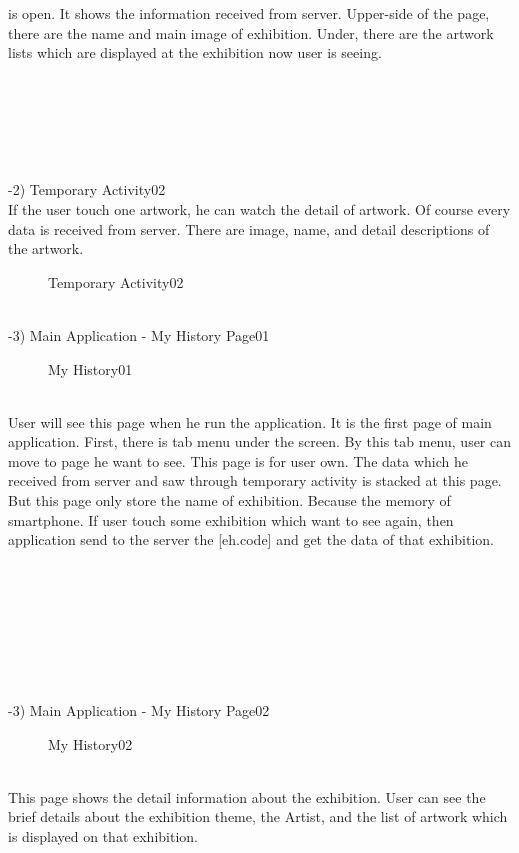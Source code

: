 \documentclass[conference]{IEEEtran}
\begin{document}
is open. It shows the information received from server. Upper-side of the page, there are the name and main image of exhibition. Under, there are the artwork lists which are displayed at the exhibition now user is seeing.\\\\\\\\\\\\\\

-2) Temporary Activity02 \\
\quad If the user touch one artwork, he can watch the detail of artwork. Of course every data is received from server. There are image, name, and detail descriptions of the artwork. 
\begin{figure}[htbp]
\begin{center}
    \caption{Temporary Activity02} 
\end{center}
\end{figure}
\\

-3) Main Application - My History Page01\\
\begin{figure}[htbp]
\begin{center}
    \caption{My History01} 
\end{center}
\end{figure}\\
\quad User will see this page when he run the application. It is the first page of main application. First, there is tab menu under the screen. By this tab menu, user can move to page he want to see.  This page is for user own. The data which he received from server and saw through temporary activity is stacked at this page. But this page only store the name of exhibition. Because the memory of smartphone. If user touch some exhibition which want to see again, then application send to the server the [eh.code] and get the data of that exhibition.\\\\\\\\\\\\\\\

-3) Main Application - My History Page02\\
\begin{figure}[htbp]
\begin{center}
    \caption{My History02} 
\end{center}
\end{figure}\\
\quad This page shows the detail information about the exhibition. User can see the brief details about the exhibition theme, the Artist, and the list of artwork which is displayed on that exhibition. \\\\
\end{document}
